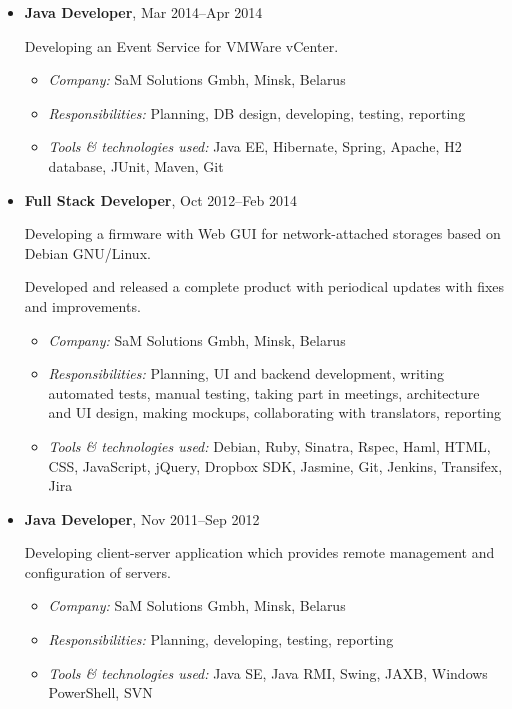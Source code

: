 \documentclass[a4paper, 12pt]{article}
\newcommand{\position}[1]{
    \textbf{#1}}
\newcommand{\itemlabel}[1]{
    \textit{#1:}}
\begin{document}
\begin{itemize}
        \item \position{Java Developer}, Mar 2014--Apr 2014

            Developing an Event Service for VMWare vCenter.

            \begin{itemize}
                \item \itemlabel{Company} SaM Solutions Gmbh, Minsk, Belarus
                \item \itemlabel{Responsibilities} Planning, DB design, developing, testing, reporting
                \item \itemlabel{Tools \& technologies used} Java EE, Hibernate, Spring, Apache, H2 database, JUnit, Maven, Git
            \end{itemize}

        \item \position{Full Stack Developer}, Oct 2012--Feb 2014

            Developing a firmware with Web GUI for network-attached storages based on Debian GNU/Linux.

            Developed and released a complete product with periodical updates with fixes and improvements.

            \begin{itemize}
                \item \itemlabel{Company} SaM Solutions Gmbh, Minsk, Belarus
                \item \itemlabel{Responsibilities} Planning, UI and backend development, writing automated tests, manual testing, taking part in meetings, architecture and UI design, making mockups, collaborating with translators, reporting
                \item \itemlabel{Tools \& technologies used} Debian, Ruby, Sinatra, Rspec, Haml, HTML, CSS, JavaScript, jQuery, Dropbox SDK, Jasmine, Git, Jenkins, Transifex, Jira
            \end{itemize}

        \item \position{Java Developer}, Nov 2011--Sep 2012

            Developing client-server application which provides remote management and configuration of servers.

            \begin{itemize}
                \item \itemlabel{Company} SaM Solutions Gmbh, Minsk, Belarus
                \item \itemlabel{Responsibilities} Planning, developing, testing, reporting
                \item \itemlabel{Tools \& technologies used} Java SE, Java RMI, Swing, JAXB, Windows PowerShell, SVN
            \end{itemize}


\end{itemize}
\end{document}
